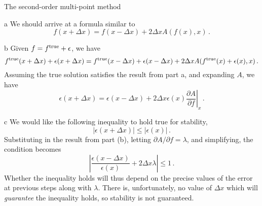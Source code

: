 \documentclass[]{homework}
\begin{document}


\begin{problem}{1} The second-order multi-point method

  \begin{subproblem}{a} We should arrive at a formula similar to
    \[
      f(x+\Delta x) = f(x-\Delta x) + 2 \Delta x A(f(x), x)\,.
    \]
  \end{subproblem}
  \begin{subproblem}{b}
    Given $f = f^{\rm true} + \epsilon$, we have
    \[
      f^{\rm true}(x+\Delta x) + \epsilon(x+\Delta x)
      = f^{\rm true}(x-\Delta x) + \epsilon(x -\Delta x) + 2 \Delta x A(f^{\rm true}(x) + \epsilon(x), x)\,.
    \]
    Assuming the true solution satisfies the result from part a, and expanding $A$, we have
    \[
      \epsilon(x+\Delta x)
      = \epsilon(x -\Delta x) + 2 \Delta x \epsilon(x) \left. \frac{\partial A}{\partial f} \right|_{x}\,.
    \]
  \end{subproblem}
  \begin{subproblem}{c}
    We would like the following inequality to hold true for stability,
    \[
      \left| \epsilon(x+\Delta x) \right| \le  \left| \epsilon(x) \right|\,.
    \]
    Substituting in the result from part (b), letting $\partial A / \partial f = \lambda$, and simplifying,
    the condition becomes
    \[
      \left| \frac{\epsilon(x -\Delta x)}{\epsilon(x)} + 2 \Delta x \lambda \right| \le 1\,.
    \]
    Whether the inequality holds will thus depend on the precise values of the error
    at previous steps along with $\lambda$. There is, unfortunately, no value of $\Delta x$
    which will {\em guarantee} the inequality holds, so stability is not guaranteed.
  \end{subproblem}


\end{problem}
\end{document}
